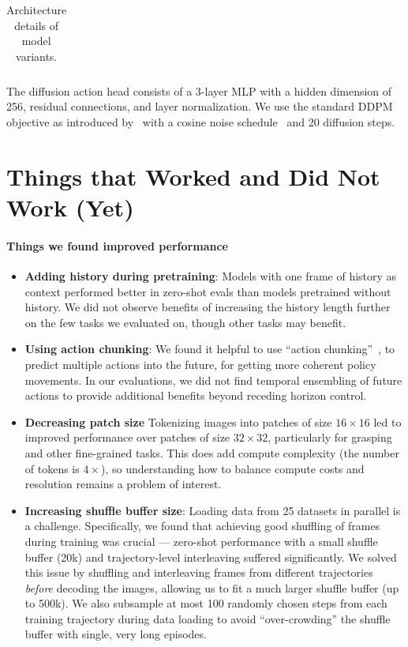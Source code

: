 \begin{appendices}
\begin{table}[th]
\begin{tabular}{l c c c c c}
\bottomrule
\end{tabular}
\caption{Architecture details of \method{} model variants.}
\label{tab:models}
\end{table}

The diffusion action head consists of a 3-layer MLP with a hidden dimension of 256, residual connections, and layer normalization. We use the standard DDPM objective as introduced by~\citep{ho2020denoising} with a cosine noise schedule~\citep{nichol2021improved} and 20 diffusion steps.






\section{Things that Worked and Did Not Work (Yet)}
\label{sec:app:things_that_did_not_work}

\paragraph{Things we found improved performance}
\begin{itemize}
    \item \textbf{Adding history during pretraining}: Models with one frame of history as context performed better in zero-shot evals than models pretrained without history. We did not observe benefits of increasing the history length further on the few tasks we evaluated on, though other tasks may benefit.
    \item \textbf{Using action chunking}: We found it helpful to use ``action chunking''~\citep{zhao2023learning}, \ie to predict multiple actions into the future, for getting more coherent policy movements. In our evaluations, we did not find temporal ensembling of future actions to provide additional benefits beyond receding horizon control.
    \item \textbf{Decreasing patch size} Tokenizing images into patches of size $16 \times 16$  led to improved performance over patches of size $32 \times 32$, particularly for grasping and other fine-grained tasks. This does add compute complexity (the number of tokens is $4 \times$), so understanding how to balance compute costs and resolution remains a problem of interest.
    \item \textbf{Increasing shuffle buffer size}: Loading data from 25 datasets in parallel is a challenge. Specifically, we found that achieving good shuffling of frames during training was crucial --- zero-shot performance with a small shuffle buffer (20k) and trajectory-level interleaving suffered significantly.
    We solved this issue by shuffling and interleaving frames from different trajectories \textit{before} decoding the images, allowing us to fit a much larger shuffle buffer (up to 500k). We also subsample at most 100 randomly chosen steps from each training trajectory during data loading to avoid ``over-crowding'' the shuffle buffer with single, very long episodes.
\end{itemize}


\end{appendices}
